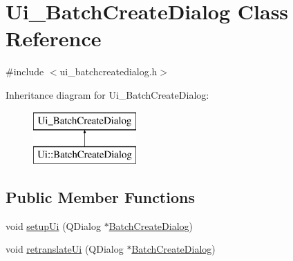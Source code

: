 \hypertarget{class_ui___batch_create_dialog}{}\section{Ui\+\_\+\+Batch\+Create\+Dialog Class Reference}
\label{class_ui___batch_create_dialog}


{\ttfamily \#include $<$ui\+\_\+batchcreatedialog.\+h$>$}

Inheritance diagram for Ui\+\_\+\+Batch\+Create\+Dialog\+:\begin{figure}[H]
\begin{center}
\leavevmode
\includegraphics[height=2.000000cm]{d7/d9d/class_ui___batch_create_dialog}
\end{center}
\end{figure}
\subsection*{Public Member Functions}
\begin{DoxyCompactItemize}
\item 
void \mbox{\hyperlink{class_ui___batch_create_dialog_ac4e4aa7012fb6b862e156e759036adac}{setup\+Ui}} (Q\+Dialog $\ast$\mbox{\hyperlink{class_batch_create_dialog}{Batch\+Create\+Dialog}})
\item 
void \mbox{\hyperlink{class_ui___batch_create_dialog_a49c63fbdf016bdee3e5b4a16e7b164cd}{retranslate\+Ui}} (Q\+Dialog $\ast$\mbox{\hyperlink{class_batch_create_dialog}{Batch\+Create\+Dialog}})
\end{DoxyCompactItemize}
